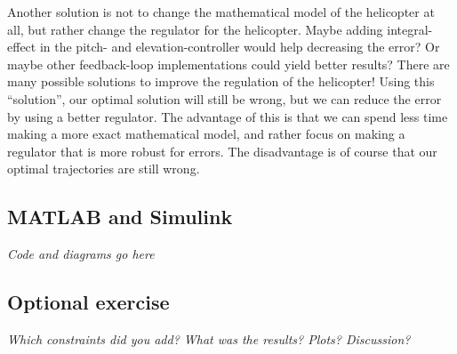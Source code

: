 \documentclass[../main.tex]{subfiles}
\begin{document}
Another solution is not to change the mathematical model of the helicopter at all, but rather change the regulator for the helicopter. Maybe adding integral-effect in the pitch- and elevation-controller would help decreasing the error? Or maybe other feedback-loop implementations could yield better results? There are many possible solutions to improve the regulation of the helicopter! Using this ``solution'', our optimal solution will still be wrong, but we can reduce the error by using a better regulator. The advantage of this is that we can spend less time making a more exact mathematical model, and rather focus on making a regulator that is more robust for errors. The disadvantage is of course that our optimal trajectories are still wrong.



\subsection{MATLAB and Simulink}
\textit{Code and diagrams go here}

\subsection{Optional exercise}
\textit{Which constraints did you add? What was the results? Plots? Discussion?}
\end{document}
